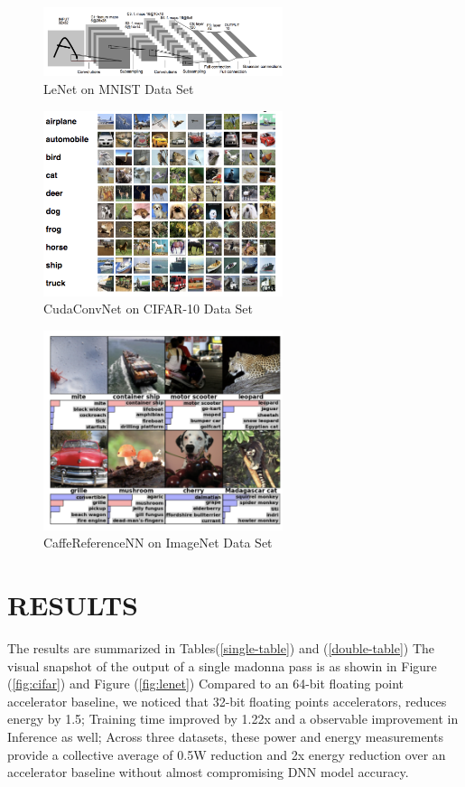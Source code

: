 \documentclass[letterpaper, 10 pt, conference]{ieeeconf}
\begin{document}
          \begin{figure}[h]
              \centering
              \includegraphics[width=70mm,scale=1]{lenet_ds}
              \caption{LeNet on MNIST Data Set}
              \label{fig:lenet_ds}
          \end{figure}
          \begin{figure}[h]
              \centering
              \includegraphics[width=70mm,scale=1]{cifar10_ds}
              \caption{CudaConvNet on CIFAR-10 Data Set}
              \label{cifar10_ds}
          \end{figure}
          \begin{figure}[h]
              \centering
              \includegraphics[width=70mm,scale=1]{imagenet_ds}
              \caption{CaffeReferenceNN on ImageNet Data Set}
              \label{imagenet_ds}
          \end{figure}


\section{RESULTS}

The results are summarized in Tables(\ref{single-table}) and (\ref{double-table}) 
The visual snapshot of the output of a single madonna pass is as showin in 
Figure (\ref{fig:cifar}) and Figure (\ref{fig:lenet}) Compared to an 64-bit floating point accelerator baseline, 
we noticed that 32-bit floating points accelerators, reduces energy by 1.5; 
Training time improved by 1.22x and a observable improvement in Inference as well;
Across three datasets, these power and energy measurements provide a collective average of 0.5W reduction 
and 2x energy reduction over an accelerator baseline without almost compromising DNN model accuracy.
\end{document}
